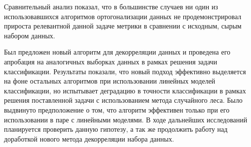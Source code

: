 \documentclass[runningheads]{llncs}
\begin{document}
Сравнительный анализ показал, что в большинстве случаев ни один из использовавшихся алгоритмов ортогонализации данных не продемонстрировал прироста релевантной данной задаче метрики в сравнении с исходным, сырым набором данных. \par
Был предложен новый алгоритм для декорреляции данных и проведена его апробация на аналогичных выборках данных в рамках решения задачи классификации. Результаты показали, что новый подход эффективно выделяется на фоне остальных алгоритмов при использовании линейных моделей классификации, но испытывает деградацию в точности классификации в рамках решения поставленной задачи с использованием метода случайного леса. Было выдвинуто предположение о том, что алгоритм эффективен только при его использовании в паре с линейными моделями. В ходе дальнейших исследований планируется проверить данную гипотезу, а так же продолжить работу над доработкой нового метода декорреляции набора данных.
%
%
%
%
\end{document}
